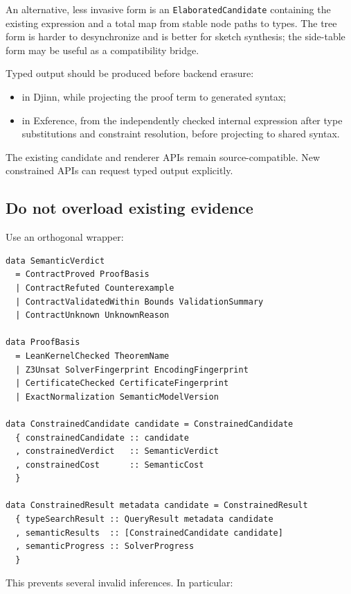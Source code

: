 \documentclass[11pt,oneside]{article}
\newcommand{\code}[1]{\texttt{#1}}
\begin{document}
An alternative, less invasive form is an \code{ElaboratedCandidate} containing the
existing expression and a total map from stable node paths to types. The tree form is
harder to desynchronize and is better for sketch synthesis; the side-table form may be
useful as a compatibility bridge.

Typed output should be produced before backend erasure:

\begin{itemize}
  \item in Djinn, while projecting the proof term to generated syntax;
  \item in Exference, from the independently checked internal expression after type
        substitutions and constraint resolution, before projecting to shared syntax.
\end{itemize}

The existing candidate and renderer APIs remain source-compatible. New constrained
APIs can request typed output explicitly.

\subsection{Do not overload existing evidence}

Use an orthogonal wrapper:

\begin{lstlisting}[language=HaskellExt,caption={Separate type-search and semantic evidence}]
data SemanticVerdict
  = ContractProved ProofBasis
  | ContractRefuted Counterexample
  | ContractValidatedWithin Bounds ValidationSummary
  | ContractUnknown UnknownReason

data ProofBasis
  = LeanKernelChecked TheoremName
  | Z3Unsat SolverFingerprint EncodingFingerprint
  | CertificateChecked CertificateFingerprint
  | ExactNormalization SemanticModelVersion

data ConstrainedCandidate candidate = ConstrainedCandidate
  { constrainedCandidate :: candidate
  , constrainedVerdict   :: SemanticVerdict
  , constrainedCost      :: SemanticCost
  }

data ConstrainedResult metadata candidate = ConstrainedResult
  { typeSearchResult :: QueryResult metadata candidate
  , semanticResults  :: [ConstrainedCandidate candidate]
  , semanticProgress :: SolverProgress
  }
\end{lstlisting}

This prevents several invalid inferences. In particular:
\end{document}
